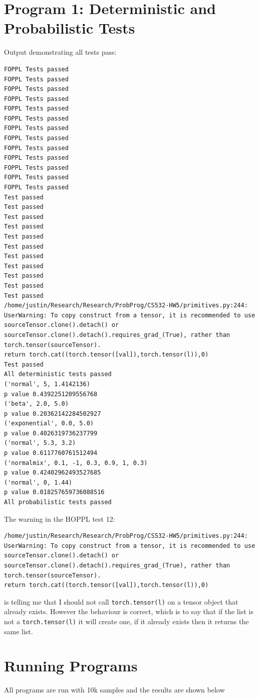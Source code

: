 \documentclass[]{article}
\begin{document}
\section{Program 1: Deterministic and Probabilistic Tests}
Output demonstrating all tests pass:
\begin{verbatim}
FOPPL Tests passed
FOPPL Tests passed
FOPPL Tests passed
FOPPL Tests passed
FOPPL Tests passed
FOPPL Tests passed
FOPPL Tests passed
FOPPL Tests passed
FOPPL Tests passed
FOPPL Tests passed
FOPPL Tests passed
FOPPL Tests passed
FOPPL Tests passed
Test passed
Test passed
Test passed
Test passed
Test passed
Test passed
Test passed
Test passed
Test passed
Test passed
Test passed
/home/justin/Research/Research/ProbProg/CS532-HW5/primitives.py:244: UserWarning: To copy construct from a tensor, it is recommended to use sourceTensor.clone().detach() or sourceTensor.clone().detach().requires_grad_(True), rather than torch.tensor(sourceTensor).
return torch.cat((torch.tensor([val]),torch.tensor(l)),0)
Test passed
All deterministic tests passed
('normal', 5, 1.4142136)
p value 0.4392251209556768
('beta', 2.0, 5.0)
p value 0.20362142284502927
('exponential', 0.0, 5.0)
p value 0.4026319736237799
('normal', 5.3, 3.2)
p value 0.6117760761512494
('normalmix', 0.1, -1, 0.3, 0.9, 1, 0.3)
p value 0.42402962493527685
('normal', 0, 1.44)
p value 0.018257659736088516
All probabilistic tests passed	
\end{verbatim}
The warning in the HOPPL test 12:
\begin{verbatim}
/home/justin/Research/Research/ProbProg/CS532-HW5/primitives.py:244: UserWarning: To copy construct from a tensor, it is recommended to use sourceTensor.clone().detach() or sourceTensor.clone().detach().requires_grad_(True), rather than torch.tensor(sourceTensor).
return torch.cat((torch.tensor([val]),torch.tensor(l)),0)
\end{verbatim}
is telling me that I should not call \texttt{torch.tensor(l)} on a tensor object that already exists. However the behaviour is correct, which is to say that if the list is not a \texttt{torch.tensor(l)} it will create one, if it already exists then it returns the same list.
\section{Running Programs}
All programs are run with 10k samples and the results are shown below
\end{document}
